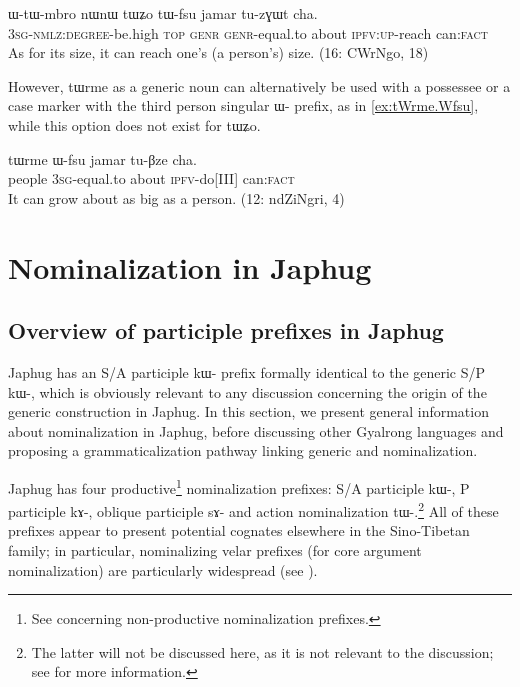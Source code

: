 \documentclass[oldfontcommands,oneside,a4paper,11pt]{article}
\newcommand{\ipa}[1]{{\phon \mbox{#1}}} %
\begin{document}
\begin{exe}
\ex  \label{ex:tWZo.tWfsu}
\gll
\ipa{ɯ-tɯ-mbro} 	\ipa{nɯnɯ} 	\ipa{tɯʑo} 	\ipa{tɯ-fsu} 	\ipa{jamar} 	\ipa{tu-zɣɯt} 	\ipa{cha.}  \\
\textsc{3sg-nmlz:degree}-be.high \textsc{top} \textsc{genr} \textsc{genr}-equal.to about \textsc{ipfv:up}-reach can:\textsc{fact} \\
\glt As for its size, it can reach one's (a person's) size. (16: CWrNgo, 18)
\end{exe}

However, \ipa{tɯrme} as a generic noun can alternatively be used with a possessee or a case marker with the third person singular \ipa{ɯ-} prefix, as in \ref{ex:tWrme.Wfsu}, while this option does not exist for \ipa{tɯʑo}.

\begin{exe}
\ex  \label{ex:tWrme.Wfsu}
\gll
 	\ipa{tɯrme} 	\ipa{ɯ-fsu} 	\ipa{jamar} 	\ipa{tu-βze} 	\ipa{cha.} \\
people \textsc{3sg}-equal.to about \textsc{ipfv}-do[III] can:\textsc{fact} \\
\glt It can grow about as big as a person. (12: ndZiNgri, 4)
\end{exe}
 
 

 \section{Nominalization in Japhug} \label{sec:nmlz}
 \subsection{Overview of participle prefixes in Japhug}
Japhug has an S/A participle \ipa{kɯ-} prefix formally identical to the generic S/P \ipa{kɯ-}, which is obviously relevant to any discussion concerning the origin of the generic construction in Japhug. In this section, we present general information about nominalization in Japhug, before discussing other Gyalrong languages and proposing a grammaticalization pathway linking generic and nominalization. 

Japhug has four productive\footnote{See \citet[4-6]{jacques14antipassive} concerning non-productive nominalization prefixes.} nominalization prefixes: S/A participle \ipa{kɯ-},   P participle \ipa{kɤ-},   oblique participle \ipa{sɤ-}  and   action nominalization \ipa{tɯ-}.\footnote{The latter will not be discussed here, as it is not relevant to the discussion; see \citet[6-9]{jacques14antipassive}  for more information.}   All of these prefixes appear to present potential cognates elsewhere in the Sino-Tibetan family; in particular, nominalizing velar prefixes (for core argument nominalization) are particularly widespread (see \citealt{konnerth09nmlz}). 
\end{document}

